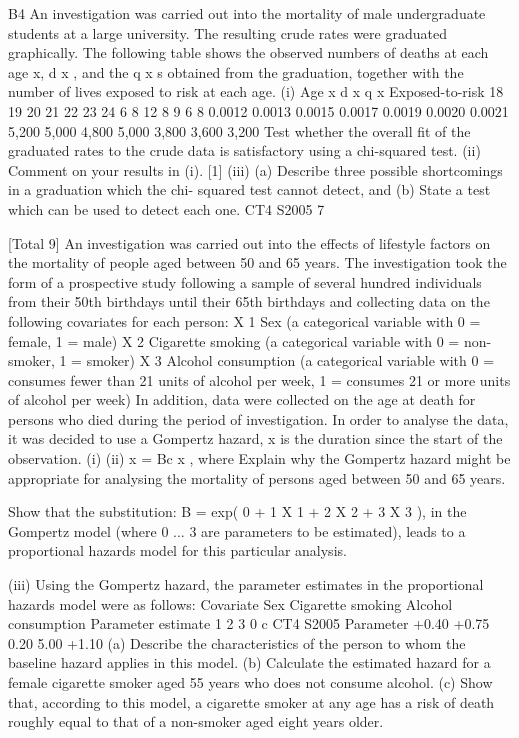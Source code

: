 \documentclass[a4paper,12pt]{article}
\begin{document}
\begin{enumerate}

B4
An investigation was carried out into the mortality of male undergraduate students at
a large university. The resulting crude rates were graduated graphically. The
following table shows the observed numbers of deaths at each age x, d x , and the q x s
obtained from the graduation, together with the number of lives exposed to risk at
each age.
(i)
Age x d x q x Exposed-to-risk
18
19
20
21
22
23
24 6
8
12
8
9
6
8 0.0012
0.0013
0.0015
0.0017
0.0019
0.0020
0.0021 5,200
5,000
4,800
5,000
3,800
3,600
3,200
Test whether the overall fit of the graduated rates to the crude data is
satisfactory using a chi-squared test. 
(ii) Comment on your results in (i). [1]
(iii) (a) Describe three possible shortcomings in a graduation which the chi-
squared test cannot detect, and (b) State a test which can be used to detect each one.
CT4 S2005
7

[Total 9]
An investigation was carried out into the effects of lifestyle factors on the mortality of
people aged between 50 and 65 years. The investigation took the form of a
prospective study following a sample of several hundred individuals from their 50th
birthdays until their 65th birthdays and collecting data on the following covariates for
each person:
X 1 Sex (a categorical variable with 0 = female, 1 = male)
X 2 Cigarette smoking (a categorical variable with 0 = non-smoker, 1 = smoker)
X 3 Alcohol consumption (a categorical variable with 0 = consumes fewer than
21 units of alcohol per week, 1 = consumes 21 or more units of alcohol
per week)
In addition, data were collected on the age at death for persons who died during the
period of investigation.
In order to analyse the data, it was decided to use a Gompertz hazard,
x is the duration since the start of the observation.
(i)
(ii)
x
= Bc x , where
Explain why the Gompertz hazard might be appropriate for analysing the
mortality of persons aged between 50 and 65 years.

Show that the substitution:
B = exp(
0
+
1
X 1 +
2
X 2 +
3
X 3 ),
in the Gompertz model (where 0 ... 3 are parameters to be estimated), leads
to a proportional hazards model for this particular analysis.

(iii)
Using the Gompertz hazard, the parameter estimates in the proportional
hazards model were as follows:
Covariate
Sex
Cigarette smoking
Alcohol consumption
Parameter estimate
1
2
3
0
c
CT4 S2005
Parameter
+0.40
+0.75
0.20
5.00
+1.10
(a) Describe the characteristics of the person to whom the baseline hazard
applies in this model.
(b) Calculate the estimated hazard for a female cigarette smoker aged 55
years who does not consume alcohol.
(c) Show that, according to this model, a cigarette smoker at any age has a
risk of death roughly equal to that of a non-smoker aged eight years
older.


\end{enumerate}
\end{document}
